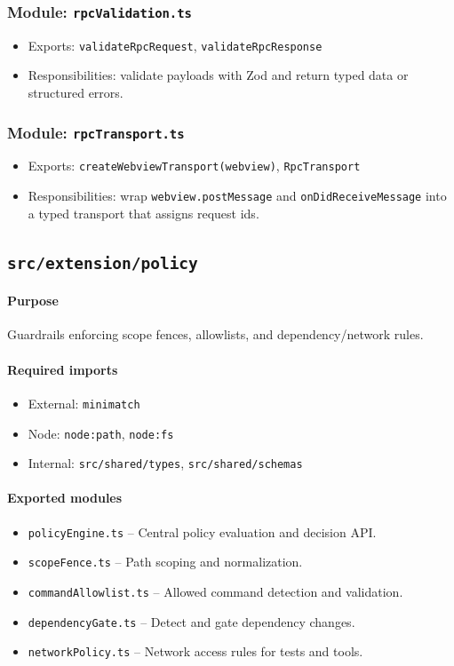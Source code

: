 \documentclass[11pt]{article}
\begin{document}
\subsubsection*{Module: \texttt{rpcValidation.ts}}
\begin{itemize}[noitemsep]
  \item Exports: \texttt{validateRpcRequest}, \texttt{validateRpcResponse}
  \item Responsibilities: validate payloads with Zod and return typed data or structured errors.
\end{itemize}

\subsubsection*{Module: \texttt{rpcTransport.ts}}
\begin{itemize}[noitemsep]
  \item Exports: \texttt{createWebviewTransport(webview)}, \texttt{RpcTransport}
  \item Responsibilities: wrap \texttt{webview.postMessage} and \texttt{onDidReceiveMessage} into
        a typed transport that assigns request ids.
\end{itemize}

\subsection{\texttt{src/extension/policy}}
\paragraph{Purpose} Guardrails enforcing scope fences, allowlists, and dependency/network rules.

\paragraph{Required imports}
\begin{itemize}[noitemsep]
  \item External: \texttt{minimatch}
  \item Node: \texttt{node:path}, \texttt{node:fs}
  \item Internal: \texttt{src/shared/types}, \texttt{src/shared/schemas}
\end{itemize}

\paragraph{Exported modules}
\begin{itemize}[noitemsep]
  \item \texttt{policyEngine.ts} -- Central policy evaluation and decision API.
  \item \texttt{scopeFence.ts} -- Path scoping and normalization.
  \item \texttt{commandAllowlist.ts} -- Allowed command detection and validation.
  \item \texttt{dependencyGate.ts} -- Detect and gate dependency changes.
  \item \texttt{networkPolicy.ts} -- Network access rules for tests and tools.
\end{itemize}
\end{document}
